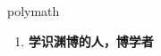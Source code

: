 
\begin{frame}
{\huge polymath}
\begin{center}
\begin{enumerate}\Large
  \item \textbf{学识渊博的人，博学者}
\end{enumerate}
\end{center}
\end{frame}
